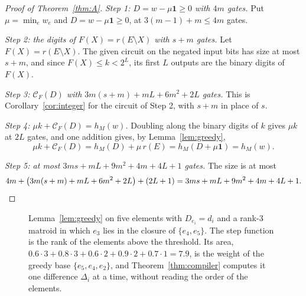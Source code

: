 \documentclass[11pt]{article}
\newcommand{\CC}{\mathcal C}
\begin{document}
\begin{proof}[Proof of Theorem~\ref{thm:A}]
\emph{Step 1: $D=w-\mu\mathbf 1\ge0$ with $4m$ gates.}  Put $\mu=\min_ew_e$ and $D=w-\mu\mathbf 1\ge0$, at
$3(m-1)+m\le4m$ gates.

\emph{Step 2: the digits of $F(X)=r(E\setminus X)$ with $s+m$ gates.}  Let $F(X)=r(E\setminus X)$.  The given circuit
on the negated input bits has size at most $s+m$, and since $F(X)\le k<2^{L}$,
its first $L$ outputs are the binary digits of $F(X)$.

\emph{Step 3: $\CC_F(D)$ with $3m(s+m)+mL+6m^{2}+2L$ gates.}  This is Corollary~\ref{cor:integer} for the circuit of Step 2, with $s+m$ in
place of $s$.

\emph{Step 4: $\mu k+\CC_F(D)=h_M(w)$.}  Doubling along the binary digits of $k$ gives $\mu k$
at $2L$ gates, and one addition gives, by Lemma~\ref{lem:greedy},
\[
  \mu k+\CC_F(D)=h_M(D)+\mu\,r(E)=h_M(D+\mu\mathbf 1)=h_M(w).
\]

\emph{Step 5: at most $3ms+mL+9m^{2}+4m+4L+1$ gates.}  The size is at most
\[
  4m+\bigl(3m(s+m)+mL+6m^{2}+2L\bigr)+(2L+1)=3ms+mL+9m^{2}+4m+4L+1.\qedhere
\]
\end{proof}

\begin{figure}[t]
  \centering
  \caption{Lemma~\ref{lem:greedy} on five elements with $D_{e_i}=d_i$ and a rank-3
  matroid in which $e_3$ lies in the closure of $\{e_4,e_5\}$.  The step function
  is the rank of the elements above the threshold.  Its area,
  $0.6\cdot3+0.8\cdot3+0.6\cdot2+0.9\cdot2+0.7\cdot1=7.9$, is the weight of the
  greedy base $\{e_5,e_4,e_2\}$, and Theorem~\ref{thm:compiler} computes it one difference
  $\Delta_i$ at a time, without reading the order of the elements.}
  \label{fig:greedy}
\end{figure}
\end{document}
